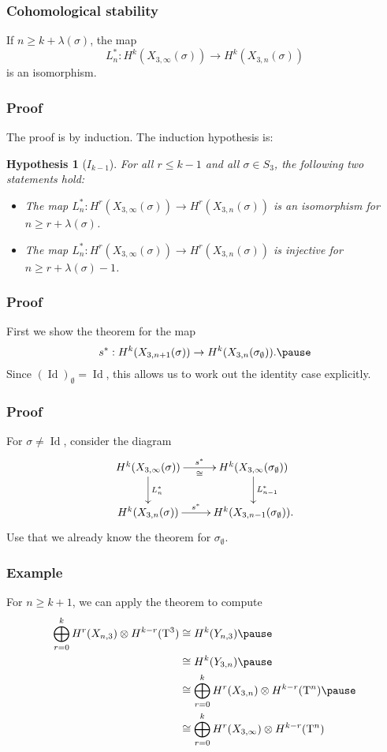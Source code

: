 \documentclass{beamer} %
\newtheorem*{hypothesis}{Hypothesis}
\DeclareMathOperator{\Id}{Id}
\newcommand{\T}{\mathrm{T}}
\begin{document}
\begin{frame}
  \frametitle{Cohomological stability}
  \begin{theorem}
    If $n \geq k + \lambda(\sigma)$, the map
    \[ L_n^* : H^k(X_{3,\infty}(\sigma)) \to H^k(X_{3,n}(\sigma)) \]
    is an isomorphism.
  \end{theorem}
\end{frame}

\begin{frame}
  \frametitle{Proof}
  The proof is by induction. The induction hypothesis is:
  \begin{hypothesis}[$I_{k-1}$]
    For all $r \leq k-1$ and all $\sigma \in S_3$, the following two
    statements hold:
    \begin{itemize}
    \item The map $L_{n}^* : H^r(X_{3,\infty}(\sigma)) \to
      H^r(X_{3,n}(\sigma))$ is an isomorphism for $n \geq r +
      \lambda(\sigma)$.
    \item The map $L_{n}^* : H^r(X_{3,\infty}(\sigma)) \to
      H^r(X_{3,n}(\sigma))$ is injective for $n \geq r +\lambda(\sigma)
      -1$.
    \end{itemize}
  \end{hypothesis}
\end{frame}

\begin{frame}
  \frametitle{Proof}
  First we show the theorem for the map
  \[ s^* : H^k(X_{3,n+1}(\sigma)) \to
  H^k(X_{3,n}(\sigma_{\emptyset})). \pause \]
  Since $(\Id)_{\emptyset} = \Id$, this allows us to work out the
  identity case explicitly.
\end{frame}

\begin{frame}
  \frametitle{Proof}
  For $\sigma\neq\Id$, consider the diagram
  \[ \xymatrix{
    H^k(X_{3,\infty}(\sigma)) \ar[r]^-{s^*}_-{\cong} \ar[d]^{L_n^*} &
    H^k(X_{3,\infty}(\sigma_{\emptyset})) \ar[d]^{L_{n-1}^*} \\
    H^k(X_{3,n}(\sigma)) \ar[r]^-{s^*} & H^k(X_{3,n-1}(\sigma_{\emptyset})).
  } \]
  Use that we already know the theorem for $\sigma_{\emptyset}$.
\end{frame}

\begin{frame}
  \frametitle{Example}
  \begin{example}
    For $n\geq k+1$, we can apply the theorem to compute
    \begin{align*}
      \bigoplus_{r=0}^k H^r(X_{n,3}) \otimes H^{k-r}(\T^3) 
      &\cong H^k(Y_{n,3}) \pause \\
      &\cong H^k(Y_{3,n}) \pause \\
      &\cong \bigoplus_{r=0}^k H^r(X_{3,n}) \otimes H^{k-r}(\T^n)
        \pause \\
      &\cong \bigoplus_{r=0}^k H^r(X_{3,\infty}) \otimes H^{k-r}(\T^n)
    \end{align*}
  \end{example}
\end{frame}
\end{document}
